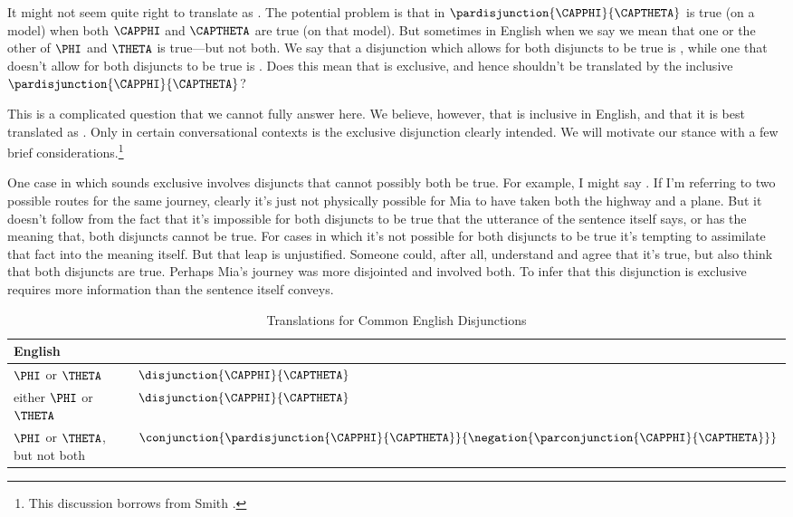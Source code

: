 It might not seem quite right to translate  as \mention{$\VEE$}. 
 The potential problem is that in \GSL{} $\pardisjunction{\CAPPHI}{\CAPTHETA}$ is true (on a model) when both $\CAPPHI$ and $\CAPTHETA$ are true (on that model). 
 But sometimes in English when we say  we mean that one or the other of $\PHI$ and $\THETA$ is true---but not both. 
 We say that a disjunction which allows for both disjuncts to be true is , while one that doesn't allow for both disjuncts to be true is .
 Does this mean that  is exclusive, and hence shouldn't be translated by the inclusive $\pardisjunction{\CAPPHI}{\CAPTHETA}$? 
 
This is a complicated question that we cannot fully answer here. 
We believe, however, that  is inclusive in English, and that it is best translated as \mention{$\VEE$}.  Only in certain conversational contexts is the exclusive disjunction clearly intended.  We will motivate our stance with a few brief considerations.\footnote{This discussion borrows from Smith \citeyear[117--22]{Smith2012}.}
 	
One case in which  sounds exclusive involves disjuncts that cannot possibly both be true. 
 	For example, I might say . 
 	If I'm referring to two possible routes for the same journey, clearly it's just not physically possible for Mia to have taken both the highway and a plane. 
 	But it doesn't follow from the fact that it's impossible for both disjuncts to be true that the utterance of the sentence itself says, or has the meaning that, both disjuncts cannot be true. 
 	For cases in which it's not possible for both disjuncts to be true it's tempting to assimilate that fact into the meaning itself. 
 	But that leap is unjustified. 
 	Someone could, after all, understand  and agree that it's true, but also think that both disjuncts are true.  Perhaps Mia's journey was more disjointed and involved both.  To infer that this disjunction is exclusive requires more information than the sentence itself conveys.
 	
 	\begin{table}
 		\renewcommand{\arraystretch}{1.5}%
 		\begin{center}
 			\begin{tabular}{ l l } %
 				\toprule
 				\textbf{English} & \textbf{\GSL{}} \\ 
 				\midrule
 				$\PHI$ or $\THETA$ & $\disjunction{\CAPPHI}{\CAPTHETA}$ \\
 				either $\PHI$ or $\THETA$ & $\disjunction{\CAPPHI}{\CAPTHETA}$ \\
 				$\PHI$ or $\THETA$, but not both & $\conjunction{\pardisjunction{\CAPPHI}{\CAPTHETA}}{\negation{\parconjunction{\CAPPHI}{\CAPTHETA}}}$ \\
 				\bottomrule
 			\end{tabular} 
 			\caption{Translations for Common English Disjunctions}
 			\label{TransTableC} 
 		\end{center}
 	\end{table}
 	
